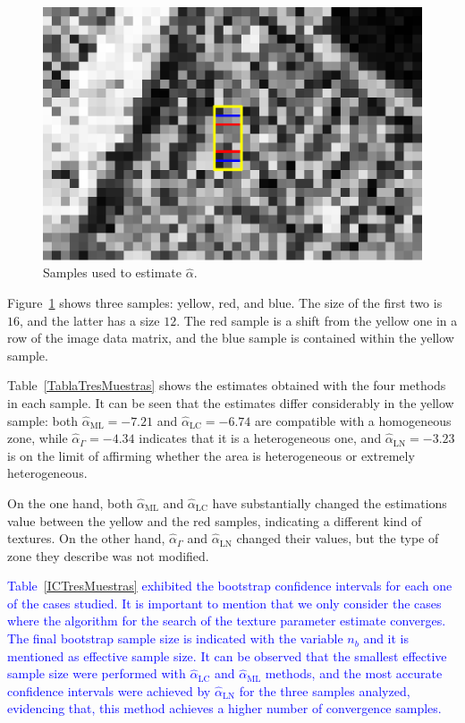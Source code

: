 \documentclass[twocolumn]{svjour3}
\begin{document}
	
	\begin{figure}[hbt]
		\centering
		\includegraphics[width=0.8\linewidth]{../../../Figures/PaperTesis/TresMuestrasAgrandada.eps}
		\caption{Samples used to estimate $\widehat{\alpha}$.}\label{TresMuestras} 
	\end{figure}
	
	Figure~\ref{TresMuestras} shows three samples: yellow, red, and blue. 
	The size of the first two is $16$, and the latter has a size $12$. 
	The red sample is a shift from the yellow one in a row of the image data matrix, and the blue sample is contained within the yellow sample.
	
	Table~\ref{TablaTresMuestras} shows the estimates obtained with the four methods in each sample. 
	It can be seen that the estimates differ considerably in the yellow sample: 
	both $\widehat{\alpha}_{\text{{ML}}}=-7.21$ and $\widehat{\alpha}_{\text{{LC}}}=-6.74$ are compatible with a homogeneous zone, while $\widehat{\alpha}_{\Gamma}=-4.34$ indicates that it is a heterogeneous one, and $\widehat{\alpha}_{\text{{LN}}}=-3.23$ is on the limit of affirming whether the area is heterogeneous or extremely heterogeneous.
	
		On the one hand, both $\widehat{\alpha}_{\text{{ML}}}$ and $\widehat{\alpha}_{\text{{LC}}}$ have substantially changed the estimations value between the yellow and the red samples, indicating a different kind of textures. 
	On the other hand, $\widehat{\alpha}_{\Gamma}$ and $\widehat{\alpha}_{\text{{LN}}}$ changed their values, but the type of zone they describe was not modified.
	
	
	\textcolor{blue}{ 
	Table~\ref{ICTresMuestras} exhibited the bootstrap confidence intervals for each one of the cases studied. 
		It is important to mention that we only consider the cases where the algorithm for the search of the texture parameter estimate converges. The final bootstrap sample size is indicated with the variable $n_b$ and it is mentioned as effective sample size.  It can be observed that the smallest effective sample size were performed with $\widehat{\alpha}_{\text{{LC}}}$ and $\widehat{\alpha}_{\text{{ML}}}$ methods, and the most accurate confidence intervals were achieved by $\widehat{\alpha}_{\text{{LN}}}$ for the three samples analyzed, evidencing that, this method achieves a higher number of convergence samples. 
	}
	
\end{document}
